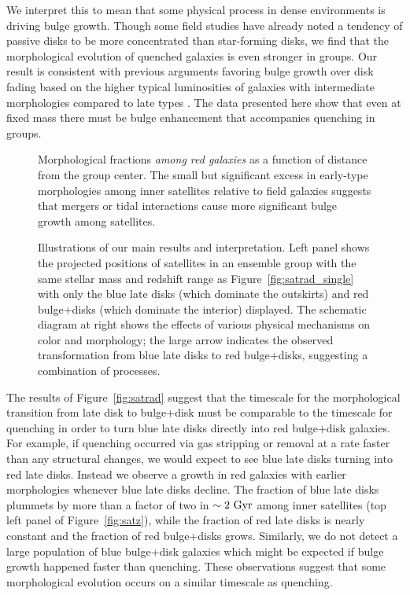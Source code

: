 \documentclass[12pt]{emulateapj}
\begin{document}
We interpret this to mean that some physical process in dense
environments is driving bulge growth. Though some field studies \citep{Bundy2010, Masters2010}
have already noted a tendency of passive disks to be more concentrated than
star-forming disks, we find that the morphological evolution of
quenched galaxies is even stronger in groups. Our result is consistent with previous
arguments favoring bulge growth over disk fading based on the higher
typical luminosities of galaxies with intermediate morphologies
compared to late types \citep{Christlein2004,Burstein2005}. The data
presented here show that even at fixed mass there must be bulge enhancement
that accompanies quenching in groups.

\begin{figure}[htb]
\caption{Morphological fractions \textit{among red galaxies} as a
  function of distance from the group center. The small but
  significant excess in early-type morphologies among inner satellites
  relative to field galaxies suggests that mergers or tidal
  interactions cause more significant bulge growth among
  satellites.}
\label{fig:satradred}
\end{figure}

\begin{figure*}[htb]
\caption{Illustrations of our main results and interpretation. Left
  panel shows the projected positions of satellites in an ensemble
  group with the same stellar mass and redshift range as
  Figure~\ref{fig:satrad_single} with only the blue late disks (which
  dominate the outskirts) and red bulge+disks (which dominate the
  interior) displayed. The schematic diagram at right shows the effects of various
  physical mechanisms on color and morphology; the large arrow
  indicates the observed transformation from blue late disks to red
  bulge+disks, suggesting a combination of processes.}
\label{fig:cartoons}
\end{figure*}

The results of Figure~\ref{fig:satrad} suggest that the timescale for
the morphological transition from late disk to bulge+disk must be
comparable to the timescale for quenching in order to turn blue late
disks directly into red bulge+disk galaxies. For example, if quenching
occurred via gas stripping or removal at a rate faster than any
structural changes, we would expect to see blue late disks turning
into red late disks. Instead we observe a growth in red galaxies with
earlier morphologies whenever blue late disks decline.  The fraction
of blue late disks plummets by more than a factor of two in
$\sim2~{\rm Gyr}$ among inner satellites (top left panel of
Figure~\ref{fig:satz}), while the fraction of red late disks is nearly
constant and the fraction of red bulge+disks grows. Similarly, we do
not detect a large population of blue bulge+disk galaxies which might
be expected if bulge growth happened faster than quenching. These
observations suggest that some morphological evolution occurs on a
similar timescale as quenching.
\end{document}
